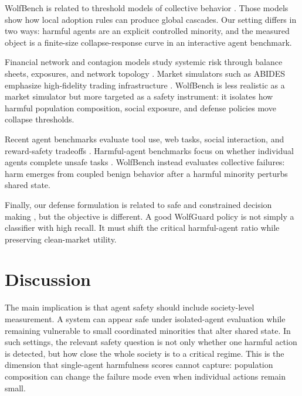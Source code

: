 \documentclass[letterpaper]{article} %
\begin{document}
WolfBench is related to threshold models of collective behavior
\citep{schelling1971dynamic,granovetter1978threshold,watts2002simple,dodds2004universal}.
Those models show how local adoption rules can produce global cascades. Our
setting differs in two ways: harmful agents are an explicit controlled minority,
and the measured object is a finite-size collapse-response curve in an
interactive agent benchmark.

Financial network and contagion models study systemic risk through balance
sheets, exposures, and network topology
\citep{haldane2011systemic,elliott2014financial,acemoglu2015systemic}. Market
simulators such as ABIDES emphasize high-fidelity trading infrastructure
\citep{byrd2019abides}. WolfBench is less realistic as a market simulator but
more targeted as a safety instrument: it isolates how harmful population
composition, social exposure, and defense policies move collapse thresholds.

Recent agent benchmarks evaluate tool use, web tasks, social interaction, and
reward-safety tradeoffs
\citep{park2023generative,liu2023agentbench,zhou2023webarena,zhou2023sotopia,pan2023machiavelli}.
Harmful-agent benchmarks focus on whether individual agents complete unsafe
tasks \citep{andriushchenko2024agentharm}. WolfBench instead evaluates
collective failures: harm emerges from coupled benign behavior after a harmful
minority perturbs shared state.

Finally, our defense formulation is related to safe and constrained decision
making \citep{leike2017safetygridworlds,achiam2017constrained}, but the
objective is different. A good WolfGuard policy is not simply a classifier with
high recall. It must shift the critical harmful-agent ratio while preserving
clean-market utility.

\section{Discussion}

The main implication is that agent safety should include society-level
measurement. A system can appear safe under isolated-agent evaluation while
remaining vulnerable to small coordinated minorities that alter shared state.
In such settings, the relevant safety question is not only whether one harmful
action is detected, but how close the whole society is to a critical regime.
This is the dimension that single-agent harmfulness scores cannot capture:
population composition can change the failure mode even when individual
actions remain small.
\end{document}
